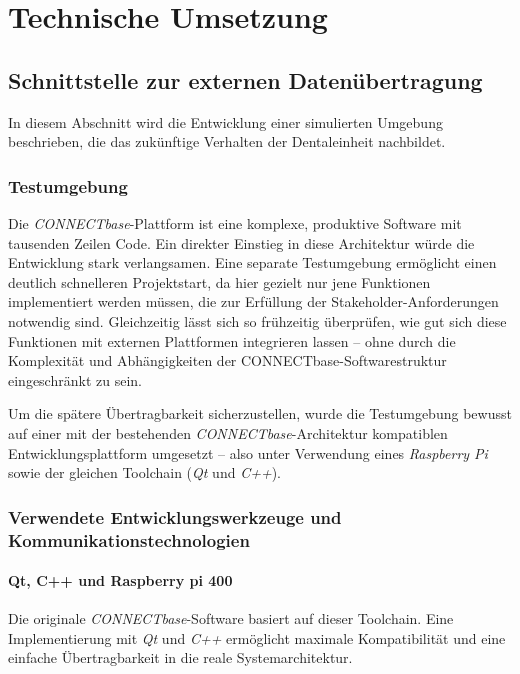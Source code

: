 \chapter{Technische Umsetzung}
\label{chap:umsetzung}

\section{Schnittstelle zur externen Datenübertragung}
\label{sec:schnittstelle}

In diesem Abschnitt wird die Entwicklung einer simulierten Umgebung beschrieben, die das zukünftige Verhalten der Dentaleinheit nachbildet. 
\subsection{Testumgebung}

Die \textit{CONNECTbase}-Plattform ist eine komplexe, produktive Software mit tausenden Zeilen Code. Ein direkter Einstieg in diese Architektur würde die Entwicklung stark verlangsamen. Eine separate Testumgebung ermöglicht einen deutlich schnelleren Projektstart, da hier gezielt nur jene Funktionen implementiert werden müssen, die zur Erfüllung der Stakeholder-Anforderungen notwendig sind. Gleichzeitig lässt sich so frühzeitig überprüfen, wie gut sich diese Funktionen mit externen Plattformen integrieren lassen – ohne durch die Komplexität und Abhängigkeiten der CONNECTbase-Softwarestruktur eingeschränkt zu sein.
  
Um die spätere Übertragbarkeit sicherzustellen, wurde die Testumgebung bewusst auf einer mit der bestehenden \textit{CONNECTbase}-Architektur kompatiblen Entwicklungsplattform umgesetzt – also unter Verwendung eines \textit{Raspberry Pi} sowie der gleichen Toolchain (\textit{Qt} und \textit{C++}).

\subsection{Verwendete Entwicklungswerkzeuge und Kommunikationstechnologien}
\subsubsection{Qt, C++ und Raspberry pi 400}
Die originale \textit{CONNECTbase}-Software basiert auf dieser Toolchain. Eine Implementierung mit \textit{Qt} und \textit{C++} ermöglicht maximale Kompatibilität und eine einfache Übertragbarkeit in die reale Systemarchitektur.

